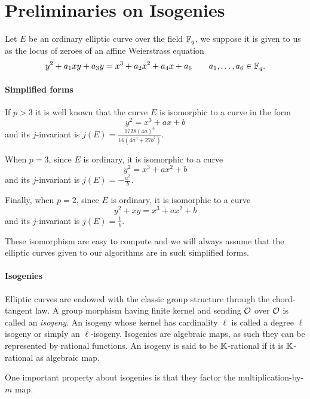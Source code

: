 \section{Preliminaries on Isogenies}

Let $E$ be an ordinary elliptic curve over the field $\mathbb{F}_q$, we
suppose it is given to us as the locus of zeroes of an affine
Weierstrass equation
\[y^2 + a_1xy + a_3y = x^3 + a_2x^2 + a_4x + a_6
\qquad a_1,\ldots,a_6\in\mathbb{F}_q\text{.}\]

\paragraph{Simplified forms} If $p>3$ it is well known that the curve
$E$ is isomorphic to a curve in the form
\begin{equation}
  \label{eq:weierstrass>3}
  y^2 = x^3 + ax + b
\end{equation}
and its $j$-invariant is $j(E) = \frac{1728(4a)^3}{16(4a^3 + 27b^2)}$.

When $p=3$, since $E$ is ordinary, it is isomorphic to a curve
\begin{equation}
  \label{eq:weierstrass=3}
  y^2 = x^3 + ax^2 + b
\end{equation}
and its $j$-invariant is $j(E) = -\frac{a^3}{b}$.

Finally, when $p=2$, since $E$ is ordinary, it is isomorphic to a curve
\begin{equation}
  \label{eq:weierstrass=2}
  y^2 + xy = x^3 + ax^2 + b
\end{equation}
and its $j$-invariant is $j(E) = \frac{1}{b}$.

These isomorphism are easy to compute and we will always assume that
the elliptic curves given to our algorithms are in such simplified
forms.

\paragraph{Isogenies}
Elliptic curves are endowed with the classic group structure through
the chord-tangent law. A group morphism having finite kernel and
sending $\mathcal{O}$ over $\mathcal{O}$ is called an \emph{isogeny}. An isogeny whose
kernel has cardinality $\ell$ is called a degree $\ell$ isogeny or
simply an $\ell$-isogeny. Isogenies are algebraic maps, as such they
can be represented by rational functions. An isogeny is said to be
$\mathbb{K}$-rational if it is $\mathbb{K}$-rational as algebraic map.

One important property about isogenies is that they factor the
multiplication-by-$m$ map.

